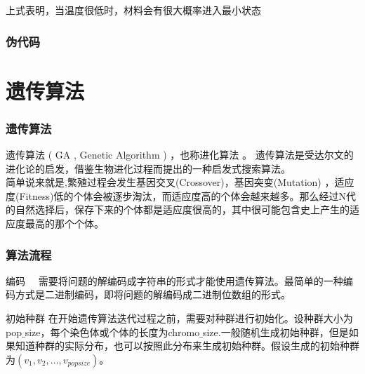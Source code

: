 \documentclass{beamer}
\begin{document}
\begin{spacing}{1.5}
\begin{frame}
			上式表明，当温度很低时，材料会有很大概率进入最小状态
	\end{frame}
	\begin{frame}
		\frametitle{伪代码}

		
	\end{frame}
	
	\section{遗传算法}
		\begin{frame}\footnotesize
			\frametitle{遗传算法}
				遗传算法 ( GA , Genetic Algorithm ) ，也称进化算法 。 遗传算法是受达尔文的进化论的启发，借鉴生物进化过程而提出的一种启发式搜索算法。\\
				简单说来就是,繁殖过程会发生基因交叉(Crossover)，基因突变(Mutation) ，适应度(Fitness)低的个体会被逐步淘汰，而适应度高的个体会越来越多。那么经过N代的自然选择后，保存下来的个体都是适应度很高的，其中很可能包含史上产生的适应度最高的那个个体。
		\end{frame}
		\begin{frame}\footnotesize
			\frametitle{算法流程}
			\begin{block}{编码}
			　需要将问题的解编码成字符串的形式才能使用遗传算法。最简单的一种编码方式是二进制编码，即将问题的解编码成二进制位数组的形式。
			\end{block}
			\begin{block}{初始种群}
			在开始遗传算法迭代过程之前，需要对种群进行初始化。设种群大小为pop$\_$size，每个染色体或个体的长度为chromo$\_$size.一般随机生成初始种群，但是如果知道种群的实际分布，也可以按照此分布来生成初始种群。假设生成的初始种群为$(v_1, v_2, …, v_{popsize})$。
			\end{block}
			

\end{frame}
\end{spacing}
\end{document}

